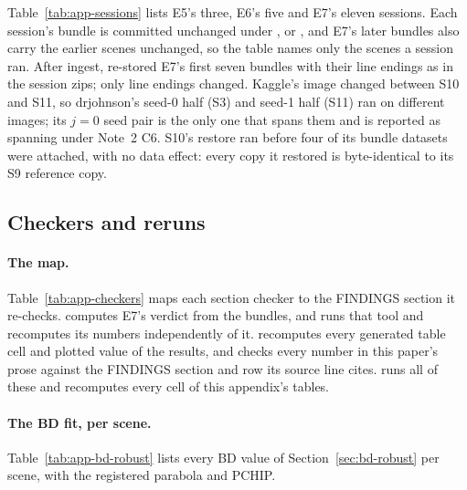 Table~\ref{tab:app-sessions} lists E5's three, E6's five and E7's eleven sessions. %
Each session's bundle is committed unchanged under ,  or , and E7's later bundles also carry the earlier scenes unchanged, so the table names only the scenes a session ran. %
After ingest,  re-stored E7's first seven bundles with their line endings as in the session zips; only line endings changed. %
Kaggle's image changed between S10 and S11, so drjohnson's seed-0 half (S3) and seed-1 half (S11) ran on different images; its $j = 0$ seed pair is the only one that spans them and is reported as spanning under Note~2 C6. %
S10's restore ran before four of its bundle datasets were attached, with no data effect: every copy it restored is byte-identical to its S9 reference copy. %



\subsection{Checkers and reruns}
\label{sec:app-checkers}

\paragraph{The map.}
Table~\ref{tab:app-checkers} maps each section checker to the FINDINGS section it re-checks. %
 computes E7's verdict from the bundles, and  runs that tool and recomputes its numbers independently of it. %
 recomputes every generated table cell and plotted value of the results, and  checks every number in this paper's prose against the FINDINGS section and  row its source line cites. %
 runs all of these and recomputes every cell of this appendix's tables.



\paragraph{The BD fit, per scene.}
Table~\ref{tab:app-bd-robust} lists every BD value of Section~\ref{sec:bd-robust} per scene, with the registered parabola and PCHIP. %

